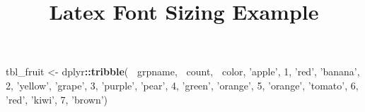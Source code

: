 \documentclass[]{article}
\title{Latex Font Sizing Example}
\author{}
\date{\vspace{-2.5em}}
\newenvironment{Shaded}{\begin{snugshade}}{\end{snugshade}}
\newcommand{\DecValTok}[1]{\textcolor[rgb]{0.00,0.00,0.81}{#1}}
\newcommand{\KeywordTok}[1]{\textcolor[rgb]{0.13,0.29,0.53}{\textbf{#1}}}
\newcommand{\NormalTok}[1]{#1}
\newcommand{\OperatorTok}[1]{\textcolor[rgb]{0.81,0.36,0.00}{\textbf{#1}}}
\newcommand{\StringTok}[1]{\textcolor[rgb]{0.31,0.60,0.02}{#1}}
\begin{document}
\maketitle

\begin{Shaded}
\begin{Highlighting}[]
\NormalTok{tbl_fruit <-}\StringTok{ }\NormalTok{dplyr}\OperatorTok{::}\KeywordTok{tribble}\NormalTok{( }\OperatorTok{~}\NormalTok{grpname, }\OperatorTok{~}\NormalTok{count, }\OperatorTok{~}\NormalTok{color,}
                             \StringTok{'apple'}\NormalTok{, }\DecValTok{1}\NormalTok{, }\StringTok{'red'}\NormalTok{,}
                             \StringTok{'banana'}\NormalTok{, }\DecValTok{2}\NormalTok{, }\StringTok{'yellow'}\NormalTok{,}
                             \StringTok{'grape'}\NormalTok{, }\DecValTok{3}\NormalTok{, }\StringTok{'purple'}\NormalTok{,}
                             \StringTok{'pear'}\NormalTok{, }\DecValTok{4}\NormalTok{, }\StringTok{'green'}\NormalTok{,}
                             \StringTok{'orange'}\NormalTok{, }\DecValTok{5}\NormalTok{, }\StringTok{'orange'}\NormalTok{,}
                             \StringTok{'tomato'}\NormalTok{, }\DecValTok{6}\NormalTok{, }\StringTok{'red'}\NormalTok{,}
                             \StringTok{'kiwi'}\NormalTok{, }\DecValTok{7}\NormalTok{, }\StringTok{'brown'}\NormalTok{)}



\end{Highlighting}
\end{Shaded}
\end{document}

